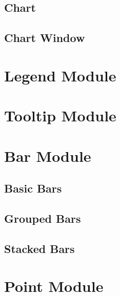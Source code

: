 \subsection{Chart}


\subsection{Chart Window}


\section{Legend Module}

\section{Tooltip Module}

\section{Bar Module}

\subsection{Basic Bars}

\subsection{Grouped Bars}

\subsection{Stacked Bars}

\section{Point Module}